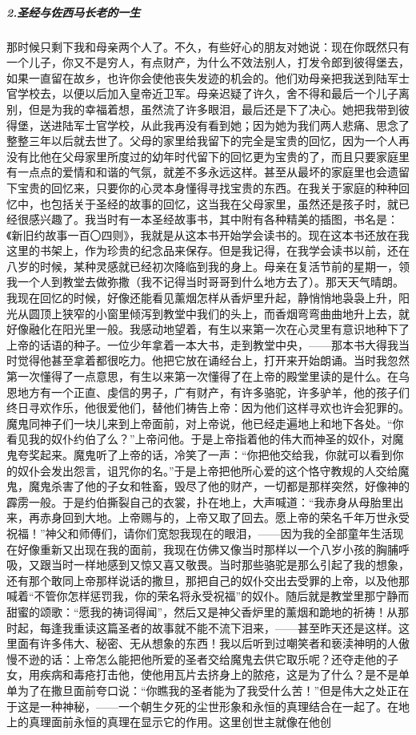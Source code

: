 \subparagraph*{2.圣经与佐西马长老的一生}
\par 那时候只剩下我和母亲两个人了。不久，有些好心的朋友对她说：现在你既然只有一个儿子，你又不是穷人，有点财产，为什么不效法别人，打发令郎到彼得堡去，如果一直留在故乡，也许你会使他丧失发迹的机会的。他们劝母亲把我送到陆军士官学校去，以便以后加入皇帝近卫军。母亲迟疑了许久，舍不得和最后一个儿子离别，但是为我的幸福着想，虽然流了许多眼泪，最后还是下了决心。她把我带到彼得堡，送进陆军士官学校，从此我再没有看到她；因为她为我们两人悲痛、思念了整整三年以后就去世了。父母的家里给我留下的完全是宝贵的回忆，因为一个人再没有比他在父母家里所度过的幼年时代留下的回忆更为宝贵的了，而且只要家庭里有一点点的爱情和和谐的气氛，就差不多永远这样。甚至从最坏的家庭里也会遗留下宝贵的回忆来，只要你的心灵本身懂得寻找宝贵的东西。在我关于家庭的种种回忆中，也包括关于圣经的故事的回忆，这当我在父母家里，虽然还是孩子时，就已经很感兴趣了。我当时有一本圣经故事书，其中附有各种精美的插图，书名是：《新旧约故事一百〇四则》，我就是从这本书开始学会读书的。现在这本书还放在我这里的书架上，作为珍贵的纪念品来保存。但是我记得，在我学会读书以前，还在八岁的时候，某种灵感就已经初次降临到我的身上。母亲在复活节前的星期一，领我一个人到教堂去做弥撒（我不记得当时哥哥到什么地方去了）。那天天气晴朗。我现在回忆的时候，好像还能看见薰烟怎样从香炉里升起，静悄悄地袅袅上升，阳光从圆顶上狭窄的小窗里倾泻到教堂中我们的头上，而香烟弯弯曲曲地升上去，就好像融化在阳光里一般。我感动地望着，有生以来第一次在心灵里有意识地种下了上帝的话语的种子。一位少年拿着一本大书，走到教堂中央，——那本书大得我当时觉得他甚至拿着都很吃力。他把它放在诵经台上，打开来开始朗诵。当时我忽然第一次懂得了一点意思，有生以来第一次懂得了在上帝的殿堂里读的是什么。在乌恩地方有一个正直、虔信的男子，广有财产，有许多骆驼，许多驴羊，他的孩子们终日寻欢作乐，他很爱他们，替他们祷告上帝：因为他们这样寻欢也许会犯罪的。魔鬼同神子们一块儿来到上帝面前，对上帝说，他已经走遍地上和地下各处。“你看见我的奴仆约伯了么？”上帝问他。于是上帝指着他的伟大而神圣的奴仆，对魔鬼夸奖起来。魔鬼听了上帝的话，冷笑了一声：“你把他交给我，你就可以看到你的奴仆会发出怨言，诅咒你的名。”于是上帝把他所心爱的这个恪守教规的人交给魔鬼，魔鬼杀害了他的子女和牲畜，毁尽了他的财产，一切都是那样突然，好像神的霹雳一般。于是约伯撕裂自己的衣裳，扑在地上，大声喊道：“我赤身从母胎里出来，再赤身回到大地。上帝赐与的，上帝又取了回去。愿上帝的荣名千年万世永受祝福！”神父和师傅们，请你们宽恕我现在的眼泪，——因为我的全部童年生活现在好像重新又出现在我的面前，我现在仿佛又像当时那样以一个八岁小孩的胸脯呼吸，又跟当时一样地感到又惊又喜又敬畏。当时那些骆驼是那么引起了我的想象，还有那个敢同上帝那样说话的撒旦，那把自己的奴仆交出去受罪的上帝，以及他那喊着“不管你怎样惩罚我，你的荣名将永受祝福”的奴仆。随后就是教堂里那宁静而甜蜜的颂歌：“愿我的祷词得闻”，然后又是神父香炉里的薰烟和跪地的祈祷！从那时起，每逢我重读这篇圣者的故事就不能不流下泪来，——甚至昨天还是这样。这里面有许多伟大、秘密、无从想象的东西！我以后听到过嘲笑者和亵渎神明的人傲慢不逊的话：上帝怎么能把他所爱的圣者交给魔鬼去供它取乐呢？还夺走他的子女，用疾病和毒疮打击他，使他用瓦片去挤身上的脓疮，这是为了什么？是不是单单为了在撒旦面前夸口说：“你瞧我的圣者能为了我受什么苦！”但是伟大之处正在于这是一种神秘，——一个朝生夕死的尘世形象和永恒的真理结合在一起了。在地上的真理面前永恒的真理在显示它的作用。这里创世主就像在他创